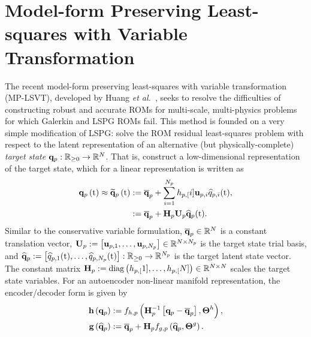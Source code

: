 \section{Model-form Preserving Least-squares with Variable Transformation}\label{sec:mplsvt}

The recent model-form preserving least-squares with variable transformation (MP-LSVT), developed by Huang \textit{et al.}~\cite{Huang2022}, seeks to resolve the difficulties of constructing robust and accurate ROMs for multi-scale, multi-physics problems for which Galerkin and LSPG ROMs fail. This method is founded on a very simple modification of LSPG: solve the ROM residual least-squares problem with respect to the latent representation of an alternative (but physically-complete) \textit{target state} $\mathbf{q}_{p}: \mathbb{R}_{\ge 0} \rightarrow \mathbb{R}^{N}$. That is, construct a low-dimensional representation of the target state, which for a linear representation is written as
%
\begin{equation}\label{eq:primSolApprox}
    \begin{aligned}
        \primFunc{\timeVar} \approx \primFuncRom{\timeVar} &\defEq \primVecCent + \sum_{\dummyIdx=1}^{\numPrimModes} \primScaleVar[\dummyIdx] \primTrialVecIdx \primVarCoefIdx (\timeVar), \\
        &\defEq \primAffineMap(\timeVar).
    \end{aligned}
\end{equation}
%
Similar to the conservative variable formulation, $\mathbf{\overline{q}}_{p} \in \mathbb{R}^{N}$ is a constant translation vector, $\primTrial \defEq \left[\primTrialVec{1},\hdots,\primTrialVec{\numPrimModes}\right] \inRTwo{\numDOF}{\numPrimModes}$ is the target state trial basis, and $\mathbf{\widehat{q}}_{p} := \left[\widehat{q}_{p,1}(\text{t}),\hdots,\widehat{q}_{p,N_p}(\text{t})\right]: \mathbb{R}_{\ge 0} \rightarrow \mathbb{R}^{N_p}$ is the target latent state vector. The constant matrix $\primScale \defEq \text{diag}\left(\primScaleVar[1], \hdots , \primScaleVar[\numDOF]\right) \inRTwo{\numDOF}{\numDOF}$ scales the target state variables. For an autoencoder non-linear manifold representation, the encoder/decoder form is given by
%
\begin{align}
    \encoderFunc{\primVec} &\defEq \nnLayer_{\encoderVar,\primVar} \left(\primScaleInv\left[\primVec - \primVecCent\right], \nnParams^{\encoderVar}\right), \\
    \decoderFunc{\primVecCoef} &\defEq \primVecCent + \primScale \nnLayer_{\decoderVar,\primVar} \left(\primVecCoef, \nnParams^{\decoderVar}\right). \label{eq:decoderFuncPrim}
\end{align}
